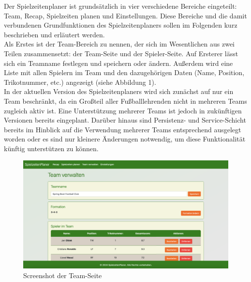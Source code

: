 
Der Spielzeitenplaner ist grundsätzlich in vier verschiedene Bereiche eingeteilt: 
Team, Recap, Spielzeiten planen und Einstellungen. Diese Bereiche und die damit 
verbundenen Grundfunktionen des Spielzeitenplaners sollen im Folgenden kurz 
beschrieben und erläutert werden. \\ 
Als Erstes ist der Team-Bereich zu nennen, der sich im Wesentlichen aus zwei Teilen 
zusammensetzt: der Team-Seite und der Spieler-Seite. Auf Ersterer lässt sich ein 
Teamname festlegen und speichern oder ändern. Außerdem wird eine Liste mit allen 
Spielern im Team und den dazugehörigen Daten (Name, Position, Trikotnummer, etc.) 
angezeigt (siehe Abbildung 1). \\ 
In der aktuellen Version des Spielzeitenplaners wird sich 
zunächst auf nur ein Team beschränkt, da ein Großteil aller Fußballlehrenden nicht in 
mehreren Teams zugleich aktiv ist. Eine Unterstützung mehrerer Teams ist jedoch in 
zukünftigen Versionen bereits eingeplant. Darüber hinaus sind Persistenz- und 
Service-Schicht bereits im Hinblick auf die Verwendung mehrerer Teams entsprechend 
ausgelegt worden oder es sind nur kleinere Änderungen notwendig, um diese Funktionalität 
künftig unterstützen zu können. \\ 

\begin{figure}[h]
  \centering
  \includegraphics[width=\textwidth]{screenshots/teampage.png}
  \caption{Screenshot der Team-Seite}
  \label{fig:teampage}
\end{figure}

